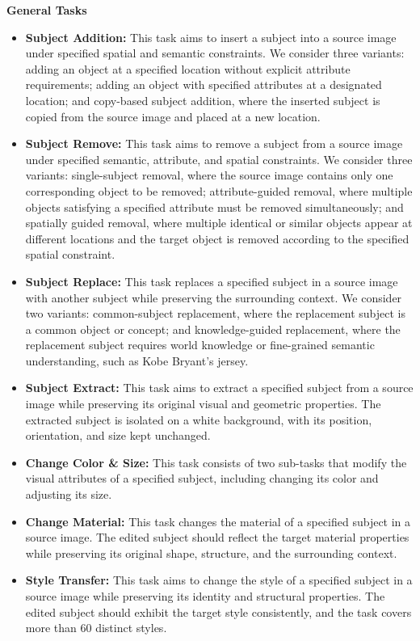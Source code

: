 \documentclass{llmxive}
\begin{document}
\textbf{General Tasks}
\begin{itemize}[leftmargin=2.2em, labelsep=0.4em, itemsep=2pt]
    \item \textbf{Subject Addition:}  This task aims to insert a subject into a source image under specified spatial and semantic constraints. We consider three variants: adding an object at a specified location without explicit attribute requirements; adding an object with specified attributes at a designated location; and copy-based subject addition, where the inserted subject is copied from the source image and placed at a new location.
    \item \textbf{Subject Remove: } This task aims to remove a subject from a source image under specified semantic, attribute, and spatial constraints. We consider three variants: single-subject removal, where the source image contains only one corresponding object to be removed; attribute-guided removal, where multiple objects satisfying a specified attribute must be removed simultaneously; and spatially guided removal, where multiple identical or similar objects appear at different locations and the target object is removed according to the specified spatial constraint.
    \item \textbf{Subject Replace:} This task replaces a specified subject in a source image with another subject while preserving the surrounding context. We consider two variants: common-subject replacement, where the replacement subject is a common object or concept; and knowledge-guided replacement, where the replacement subject requires world knowledge or fine-grained semantic understanding, such as Kobe Bryant’s jersey.
    \item \textbf{Subject Extract: } This task aims to extract a specified subject from a source image while preserving its original visual and geometric properties. The extracted subject is isolated on a white background, with its position, orientation, and size kept unchanged.
    \item \textbf{Change Color \& Size: }  This task consists of two sub-tasks that modify the visual attributes of a specified subject, including changing its color and adjusting its size.
    \item \textbf{Change Material:} This task changes the material of a specified subject in a source image. The edited subject should reflect the target material properties while preserving its original shape, structure, and the surrounding context.
    \item \textbf{Style Transfer: }  This task aims to change the style of a specified subject in a source image while preserving its identity and structural properties. The edited subject should exhibit the target style consistently, and the task covers more than 60 distinct styles.

\end{itemize}
\end{document}
